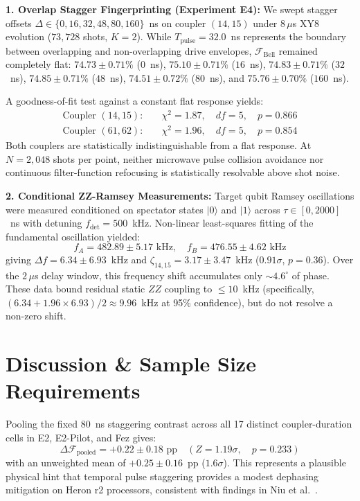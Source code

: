 \documentclass[aps,prl,twocolumn,amsmath,amssymb,superscriptaddress,floatfix]{revtex4-2}
\begin{document}
\textbf{1. Overlap Stagger Fingerprinting (Experiment E4):} We swept stagger offsets $\Delta \in \{0, 16, 32, 48, 80, 160\}$~ns on coupler $(14, 15)$ under $8\,\mu$s XY8 evolution ($73,728$ shots, $K = 2$). While $T_{\text{pulse}} = 32.0$~ns represents the boundary between overlapping and non-overlapping drive envelopes, $\mathcal{F}_{\text{Bell}}$ remained completely flat: $74.73 \pm 0.71\%$ ($0$~ns), $75.10 \pm 0.71\%$ ($16$~ns), $74.83 \pm 0.71\%$ ($32$~ns), $74.85 \pm 0.71\%$ ($48$~ns), $74.51 \pm 0.72\%$ ($80$~ns), and $75.76 \pm 0.70\%$ ($160$~ns). 

A goodness-of-fit test against a constant flat response yields:
\begin{align}
\text{Coupler }(14, 15): &\quad \chi^2 = 1.87, \quad df = 5, \quad p = 0.866 \\
\text{Coupler }(61, 62): &\quad \chi^2 = 1.96, \quad df = 5, \quad p = 0.854
\end{align}
Both couplers are statistically indistinguishable from a flat response. At $N = 2,048$ shots per point, neither microwave pulse collision avoidance nor continuous filter-function refocusing is statistically resolvable above shot noise.

\textbf{2. Conditional ZZ-Ramsey Measurements:} Target qubit Ramsey oscillations were measured conditioned on spectator states $|0\rangle$ and $|1\rangle$ across $\tau \in [0, 2000]$~ns with detuning $f_{\text{det}} = 500$~kHz. Non-linear least-squares fitting of the fundamental oscillation yielded:
\begin{equation}
f_A = 482.89 \pm 5.17\text{ kHz}, \quad f_B = 476.55 \pm 4.62\text{ kHz}
\end{equation}
giving $\Delta f = 6.34 \pm 6.93$~kHz and $\zeta_{14,15} = 3.17 \pm 3.47$~kHz ($0.91\sigma$, $p = 0.36$). Over the $2\,\mu$s delay window, this frequency shift accumulates only $\sim 4.6^\circ$ of phase. These data bound residual static $ZZ$ coupling to $\le 10$~kHz (specifically, $(6.34 + 1.96 \times 6.93)/2 \approx 9.96$~kHz at 95\% confidence), but do not resolve a non-zero shift.

\section{Discussion \& Sample Size Requirements}
Pooling the fixed $80$~ns staggering contrast across all 17 distinct coupler-duration cells in E2, E2-Pilot, and Fez gives:
\begin{equation}
\Delta \mathcal{F}_{\text{pooled}} = +0.22 \pm 0.18\text{ pp} \quad (Z = 1.19\sigma, \quad p = 0.233)
\end{equation}
with an unweighted mean of $+0.25 \pm 0.16$~pp ($1.6\sigma$). This represents a plausible physical hint that temporal pulse staggering provides a modest dephasing mitigation on Heron r2 processors, consistent with findings in Niu et al.~\cite{Niu2024}.
\end{document}
